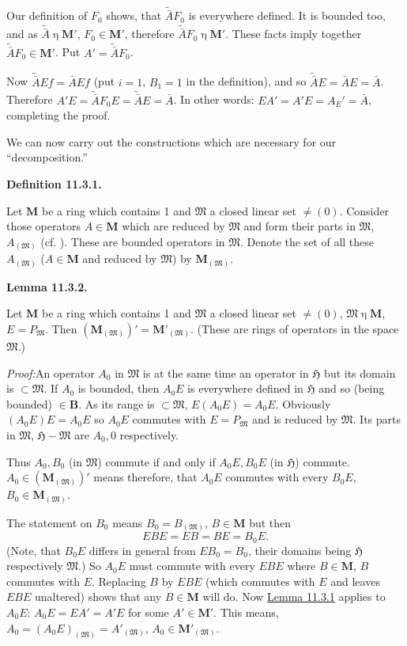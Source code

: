 \documentclass[12pt,b5paper,twoside]{article}
\newcommand{\Hspace}{\mathfrak H}
\newcommand{\M}{\mathbf M}
\newcommand{\B}{\mathbf B}
\newcommand{\Definition}[1]{%
  \par\smallskip\noindent\phantomsection\label{def:#1}\textbf{Definition #1.}\enspace
}
\newcommand{\Lemma}[1]{%
  \par\smallskip\noindent\phantomsection\label{lem:#1}\textbf{Lemma #1.}\enspace
}
\newcommand{\Proof}{\par\noindent\textit{Proof:}\enspace}
\newcommand{\lemref}[1]{\hyperref[lem:#1]{Lemma #1}}
\begin{document}
Our definition of $F_0$ shows, that $\widetilde{\bar A}F_0$ is everywhere
defined. It is bounded too, and as
$\widetilde{\bar A}\mathbin\eta\M'$, $F_0\in\M'$, therefore
$\widetilde{\bar A}F_0\mathbin\eta\M'$. These facts imply together
$\widetilde{\bar A}F_0\in\M'$. Put
$A'=\widetilde{\bar A}F_0$.

Now $\widetilde{\bar A}Ef=\bar AEf$ (put $i=1$, $B_1=1$ in the
definition), and so $\widetilde{\bar A}E=\bar AE=\bar A$. Therefore
$A'E=\widetilde{\bar A}F_0E=\widetilde{\bar A}E=\bar A$. In other words:
$EA'=A'E=A_E'=\bar A$, completing the proof.

We can now carry out the constructions which are necessary for our
``decomposition.''

\Definition{11.3.1}
Let $\M$ be a ring which contains 1 and $\mathfrak M$ a closed linear set
$\ne(0)$. Consider those operators $A\in\M$ which are reduced by
$\mathfrak M$ and form their parts in $\mathfrak M$, $A_{(\mathfrak M)}$
(cf. \cite[p.~78]{ref16}). These are bounded operators in $\mathfrak M$.
Denote the set of all these $A_{(\mathfrak M)}$ ($A\in\M$ and reduced by
$\mathfrak M$) by $\M_{(\mathfrak M)}$.

\Lemma{11.3.2}
Let $\M$ be a ring which contains 1 and $\mathfrak M$ a closed linear set
$\ne(0)$, $\mathfrak M\mathbin\eta\M$, $E=P_{\mathfrak M}$. Then
$(\M_{(\mathfrak M)})'=\M'_{(\mathfrak M)}$. (These are rings of
operators in the space $\mathfrak M$.)

\Proof An operator $A_0$ in $\mathfrak M$ is at the same time an operator
in $\Hspace$ but its domain is $\subset\mathfrak M$. If $A_0$ is bounded,
then $A_0E$ is everywhere defined in $\Hspace$ and so (being bounded)
$\in\B$. As its range is $\subset\mathfrak M$,
$E(A_0E)=A_0E$. Obviously $(A_0E)E=A_0E$ so $A_0E$ commutes with
$E=P_{\mathfrak M}$ and is reduced by $\mathfrak M$. Its parts in
$\mathfrak M$, $\Hspace-\mathfrak M$ are $A_0,0$ respectively.

Thus $A_0,B_0$ (in $\mathfrak M$) commute if and only if $A_0E,B_0E$ (in
$\Hspace$) commute. $A_0\in(\M_{(\mathfrak M)})'$ means therefore, that
$A_0E$ commutes with every $B_0E$, $B_0\in\M_{(\mathfrak M)}$.

The statement on $B_0$ means $B_0=B_{(\mathfrak M)}$, $B\in\M$ but then
\[
 EBE=EB=BE=B_0E.
\]
(Note, that $B_0E$ differs in general from $EB_0=B_0$, their domains being
$\Hspace$ respectively $\mathfrak M$.) So $A_0E$ must commute with every
$EBE$ where $B\in\M$, $B$ commutes with $E$. Replacing $B$ by $EBE$
(which commutes with $E$ and leaves $EBE$ unaltered) shows that any
$B\in\M$ will do. Now \lemref{11.3.1} applies to $A_0E$:
$A_0E=EA'=A'E$ for some $A'\in\M'$. This means,
$A_0=(A_0E)_{(\mathfrak M)}=A'_{(\mathfrak M)}$,
$A_0\in\M'_{(\mathfrak M)}$.
\end{document}
